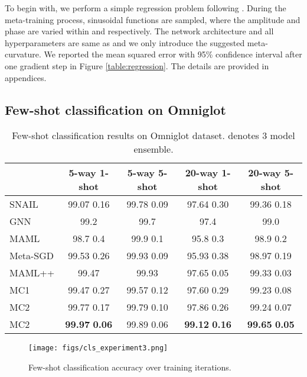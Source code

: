 \documentclass{article}
\begin{document}
To begin with, we perform a simple regression problem following \cite{Finn-icml-2017,Li-arxiv-2017}. During the meta-training process, sinusoidal functions are sampled, where the amplitude and phase are varied within  and  respectively. The network architecture and all hyperparameters are same as \cite{Finn-icml-2017} and we only introduce the suggested meta-curvature. We reported the mean squared error with 95\% confidence interval after one gradient step in Figure \ref{table:regression}. The details are provided in appendices.

\subsection{Few-shot classification on Omniglot}
\begin{table}[t]
\caption{Few-shot classification results on Omniglot dataset.  denotes 3 model ensemble. }
\label{table:omniglot}
\begin{center}
\begin{footnotesize}
\begin{tabular}{lcccc}
\toprule
& 5-way 1-shot & 5-way 5-shot & 20-way 1-shot & 20-way 5-shot \\
\midrule
SNAIL \cite{snail} & 99.07  0.16 & 99.78  0.09 & 97.64  0.30 & 99.36  0.18 \\
GNN \cite{gnn} & 99.2 & 99.7 & 97.4 & 99.0 \\
\midrule
MAML & 98.7  0.4 & 99.9  0.1 & 95.8  0.3 & 98.9  0.2 \\
Meta-SGD & 99.53  0.26 & 99.93  0.09 & 95.93  0.38 & 98.97  0.19 \\
MAML++ \cite{Antoniou-arxiv-2018} & 99.47  & 99.93 & 97.65  0.05 & 99.33  0.03 \\
MC1 & 99.47  0.27 & 99.57  0.12 & 97.60  0.29 & 99.23  0.08 \\
MC2 & 99.77  0.17 & 99.79  0.10 & 97.86  0.26 & 99.24  0.07 \\
MC2 & \textbf{99.97}  \textbf{0.06} & 99.89  0.06 & \textbf{99.12}  \textbf{0.16} & \textbf{99.65}  \textbf{0.05} \\
\bottomrule
\end{tabular}
\end{footnotesize}
\end{center}
\vskip -0.1in
\end{table}

\begin{figure*}[t]
\begin{center}
\centerline{\texttt{[image: figs/cls\_experiment3.png]}}
\caption{Few-shot classification accuracy over training iterations.}
\label{fig:cls_experiment}
\end{center}
\end{figure*}
\end{document}
